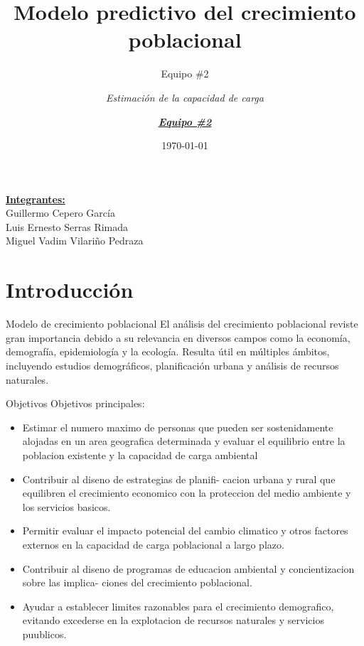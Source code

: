 \documentclass{beamer}
\title{Modelo predictivo del crecimiento poblacional}
\subtitle{Equipo \#2}
\author{\textit{Estimación de la capacidad de carga }}
\date{\today}
\begin{document}

\begin{frame}
    \titlepage 
    \underline{\textbf{Integrantes: }}\\
    Guillermo Cepero García \\ Luis Ernesto Serras Rimada \\ Miguel Vadim Vilariño Pedraza
\end{frame}

\logo{}
\author{\textit{\underline{\textbf{Equipo \#2}}}}

\section{Introducción}
\begin{frame}{Modelo de crecimiento poblacional}
    El análisis del crecimiento poblacional reviste gran importancia debido a su relevancia en diversos campos como la economía, demografía, epidemiología y la ecología. Resulta útil en múltiples ámbitos, incluyendo estudios demográficos, planificación urbana y análisis de recursos naturales.
\end{frame}

\begin{frame}{Objetivos}
    Objetivos principales:\\
\begin{itemize}
    \item Estimar el numero maximo de personas que
        pueden ser sostenidamente alojadas en un area
        geografica determinada y evaluar el equilibrio entre la poblacion existente y la capacidad de carga
        ambiental
    \item Contribuir al diseno de estrategias de planifi-
        cacion urbana y rural que equilibren el crecimiento
        economico con la proteccion del medio ambiente y
        los servicios basicos.
    \item Permitir evaluar el impacto potencial del cambio
        climatico y otros factores externos en la capacidad
        de carga poblacional a largo plazo.
    \item Contribuir al diseno de programas de educacion
        ambiental y concientizacion sobre las implica-
        ciones del crecimiento poblacional.
    \item Ayudar a establecer limites razonables para el
        crecimiento demografico, evitando excederse en
        la explotacion de recursos naturales y servicios
        puublicos.
\end{itemize}

\end{frame} 
\end{document}
